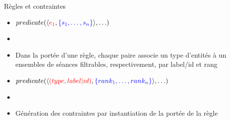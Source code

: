 \documentclass{beamer}
\begin{document}
\begin{frame}{Règles et contraintes}
\begin{itemize}
    \item[]  \hspace{1cm} $predicate(\langle \textcolor{red}{e_1},\textcolor{blue}{\{s_1,\ldots,s_n\}}\rangle, \ldots)$
    \item[] 
    \item Dans la portée d'une règle, chaque paire associe un type d'entités à un ensembles de séances filtrables, respectivement, par label/id et rang
    \item[]  \hspace{1cm} $predicate(\langle \textcolor{red}{(type,label|id)},\textcolor{blue}{\{rank_1,\ldots,rank_n\}}\rangle, \ldots)$
    \item[] 
    \item Génération des contraintes par instantiation de la portée de la règle
    \end{itemize}

\end{frame}
\end{document}
